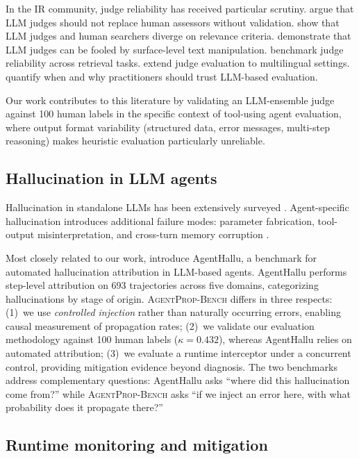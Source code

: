 \documentclass[11pt]{article}
\newcommand{\bench}{\textsc{AgentProp-Bench}\xspace}
\begin{document}
In the IR community, judge reliability has received particular scrutiny.
\citet{soboroff2024dont} argue that LLM judges should not replace human
assessors without validation.
\citet{thomas2024searcher} show that LLM judges and human searchers
diverge on relevance criteria.
\citet{alaofi2024fooled} demonstrate that LLM judges can be fooled by
surface-level text manipulation.
\citet{thakur2025judging} benchmark judge reliability across retrieval
tasks.
\citet{fu2025multilingual} extend judge evaluation to multilingual
settings.
\citet{schroeder2024trust} quantify when and why practitioners should
trust LLM-based evaluation.

Our work contributes to this literature by validating an LLM-ensemble
judge against 100 human labels in the specific context of tool-using
agent evaluation, where output format variability (structured data,
error messages, multi-step reasoning) makes heuristic evaluation
particularly unreliable.

\subsection{Hallucination in LLM agents}

Hallucination in standalone LLMs has been extensively surveyed
\citep{huang2024hallucination,lin2025agenthallusurvey}.
Agent-specific hallucination introduces additional failure modes:
parameter fabrication, tool-output misinterpretation, and cross-turn
memory corruption \citep{zhang2025memory}.

Most closely related to our work, \citet{liu2026agenthallu} introduce
AgentHallu, a benchmark for automated hallucination attribution in
LLM-based agents.
AgentHallu performs step-level attribution on 693 trajectories across
five domains, categorizing hallucinations by stage of origin.
\bench{} differs in three respects:
(1)~we use \emph{controlled injection} rather than naturally occurring
errors, enabling causal measurement of propagation rates;
(2)~we validate our evaluation methodology against 100 human labels
($\kappa{=}0.432$), whereas AgentHallu relies on automated attribution;
(3)~we evaluate a runtime interceptor under a concurrent control,
providing mitigation evidence beyond diagnosis.
The two benchmarks address complementary questions: AgentHallu asks
``where did this hallucination come from?'' while \bench{} asks
``if we inject an error here, with what probability does it propagate
there?''

\subsection{Runtime monitoring and mitigation}
\end{document}
